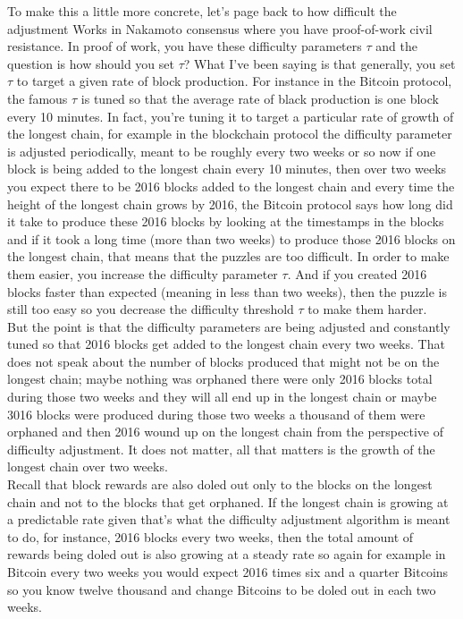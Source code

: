 To make this a little more concrete, let's page back to how
difficult the adjustment Works in Nakamoto consensus where you have proof-of-work civil resistance. In proof of work, you have these 
difficulty parameters $\tau$ and the question is how should you set $\tau$? What I've been saying is that generally, you set $\tau$ to 
target a given rate of block production. For instance in the Bitcoin protocol,  the famous $\tau$ is tuned so that the average rate of 
black production is one block every 10 minutes. In fact, you're tuning it to target a particular rate of growth of the longest chain, 
for example in the blockchain protocol the difficulty parameter is adjusted periodically, meant to be roughly every two weeks or so now 
if one block is being added to the longest chain every 10 minutes, then over two weeks you expect there to be 2016 blocks added to the 
longest chain and every time the height of the longest chain grows by 2016, the Bitcoin protocol says how long did it take to produce 
these 2016 blocks by looking at the timestamps in the blocks and if it took a long time (more than two weeks) to produce those 2016 
blocks on the longest chain, that means that the puzzles are too difficult. In order to make them easier, you increase the difficulty 
parameter $\tau$. And if
you created 2016 blocks faster than expected (meaning in less than two weeks), then the puzzle is still too easy so you decrease the 
difficulty threshold $\tau$ to make them harder.\\
But the point is that the difficulty parameters are being adjusted and constantly tuned so that 2016 blocks get added to the longest 
chain every two weeks. That does not speak about the number of blocks produced that might not be on the longest chain; maybe nothing was 
orphaned there were only 2016 blocks total during those two weeks and they will all end up in the longest chain or maybe 3016 blocks 
were produced
during those two weeks a thousand of them were orphaned and then 2016 wound up on the longest chain from the perspective of difficulty 
adjustment. It does not matter, all that matters is the growth of the longest chain over two weeks.\\

Recall that block rewards are also doled out only to the blocks on the longest chain and not to the blocks that get orphaned. 
If the longest chain is growing at a predictable rate given that's what the difficulty adjustment algorithm is meant to do, 
for instance, 2016 blocks every two weeks, then the total amount of rewards being doled out is also growing at a steady rate so again 
for example in Bitcoin every two weeks you would expect 2016 times six and a quarter Bitcoins so you know twelve thousand and change 
Bitcoins to be doled out in each two weeks.\\

